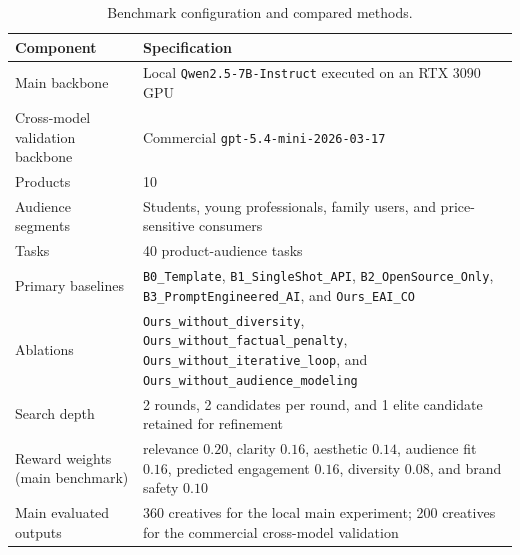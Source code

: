 
\begin{table}[t]
\centering
\caption{Benchmark configuration and compared methods.}
\label{tab:benchmark_setup}
\begin{threeparttable}
\begin{tabular}{p{2.8cm} p{11.8cm}}
\toprule
Component & Specification \\
\midrule
Main backbone & Local \texttt{Qwen2.5-7B-Instruct} executed on an RTX 3090 GPU \\
Cross-model validation backbone & Commercial \texttt{gpt-5.4-mini-2026-03-17} \\
Products & 10 \\
Audience segments & Students, young professionals, family users, and price-sensitive consumers \\
Tasks & 40 product-audience tasks \\
Primary baselines & \texttt{B0\_Template}, \texttt{B1\_SingleShot\_API}, \texttt{B2\_OpenSource\_Only}, \texttt{B3\_PromptEngineered\_AI}, and \texttt{Ours\_EAI\_CO} \\
Ablations & \texttt{Ours\_without\_diversity}, \texttt{Ours\_without\_factual\_penalty}, \texttt{Ours\_without\_iterative\_loop}, and \texttt{Ours\_without\_audience\_modeling} \\
Search depth & 2 rounds, 2 candidates per round, and 1 elite candidate retained for refinement \\
Reward weights (main benchmark) & relevance $0.20$, clarity $0.16$, aesthetic $0.14$, audience fit $0.16$, predicted engagement $0.16$, diversity $0.08$, and brand safety $0.10$ \\
Main evaluated outputs & 360 creatives for the local main experiment; 200 creatives for the commercial cross-model validation \\
\bottomrule
\end{tabular}
\end{threeparttable}
\end{table}

